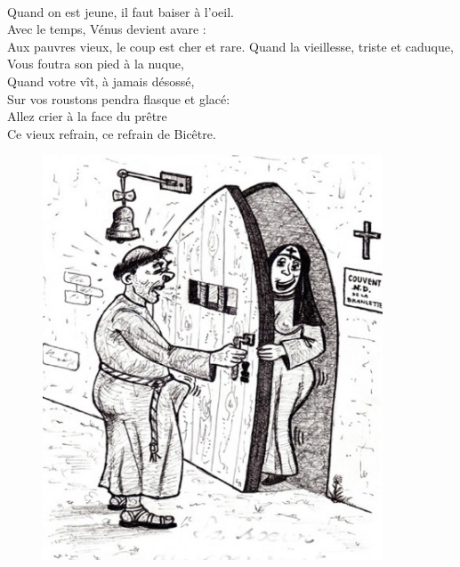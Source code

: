 \\Quand on est jeune, il faut baiser à l'oeil.
\\Avec le temps, Vénus devient avare :
\\Aux pauvres vieux, le coup est cher et rare.
\breakpage
Quand la vieillesse, triste et caduque,
\\Vous foutra son pied à la nuque,
\\Quand votre vît, à jamais désossé,
\\Sur vos roustons pendra flasque et glacé:
\\Allez crier à la face du prêtre
\\Ce vieux refrain, ce refrain de Bicêtre.
\\
\bigskip
\begin{figure}[h!]
\centering
   \includegraphics[width=0.9\textwidth]{images/bicetre.jpg}
 \end{figure}

\breakpage